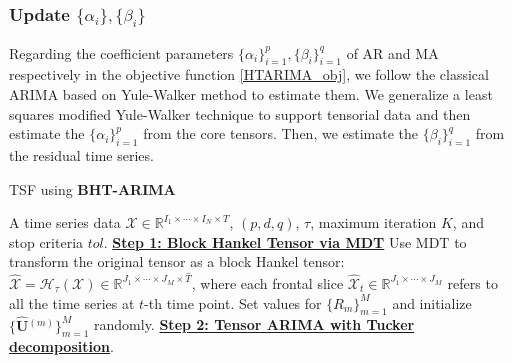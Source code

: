\documentclass[letterpaper]{article} %
\numberwithin{theorem}{section}
\newcommand{\ten}[1]{ \boldsymbol{\mathcal #1}}
\newcommand{\bbR}[1]{\mathbb{R}^{#1}}
\begin{document}
\subsubsection{Update  $ \{\alpha_i \},  \{\beta_i \} $  }
Regarding the coefficient parameters $ \{\alpha_i \}_{i=1}^p,  \{\beta_i \}_{i=1}^q $ of AR and MA  respectively in the objective function \eqref{HTARIMA_obj}, we follow the classical ARIMA  based on  Yule-Walker method  to estimate them.  We generalize a least squares modified Yule-Walker technique to support tensorial data  and  then estimate  the  $ \{\alpha_i \}_{i=1}^p $  from the core tensors. Then, we estimate the $\{\beta_i \}_{i=1}^q $  from the residual time series.



\begin{algorithm}[ttt!]	
	\small
	\caption{TSF using \textbf{BHT-ARIMA}} \label{BHTARIMAalg}	
	\begin{algorithmic}[1]
		   A   time series data  $\ten{X}\in \bbR{I_1 \times \cdots \times I_N \times T}$,  $(p,d,q)$,   $\tau$,  maximum iteration $K$,   and  stop criteria  $\textit{tol}$.
		\STATE \textbf{\underline{Step 1: Block Hankel Tensor via MDT}}
		\STATE Use MDT to transform the original tensor as {a  block Hankel tensor}: ${\widehat{\ten{X}}} = \mathcal{H}_\tau (\ten{X}) \in \bbR{J_1 \times \cdots \times J_M \times \widehat{T}}$, where each frontal slice  ${\widehat{\ten{X}}_t}  \in \bbR{J_1 \times \cdots \times J_M}$ refers to all the time series at $t$-th time point. 
		\STATE Set	values for  $ 	
		\{R_m\}_{m=1}^{M}$ and initialize $\{\widehat{ \mathbf U}{^{(m)}}\}_{m=1}^{M}$ randomly. 	
		\STATE   \textbf{\underline{Step 2:   Tensor ARIMA with Tucker decomposition}}. 
		

\end{algorithmic}
\end{algorithm}
\end{document}
